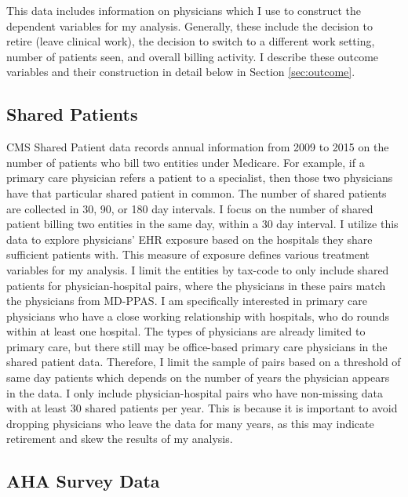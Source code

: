 \documentclass[11pt]{article}
\begin{document}
This data includes information on physicians which I use to construct the dependent variables for my analysis. Generally, these include the decision to retire (leave clinical work), the decision to switch to a different work setting, number of patients seen, and overall billing activity. I describe these outcome variables and their construction in detail below in Section \ref{sec:outcome}.


\subsection{Shared Patients}

CMS Shared Patient data records annual information from 2009 to 2015 on the number of patients who bill two entities under Medicare. For example, if a primary care physician refers a patient to a specialist, then those two physicians have that particular shared patient in common. The number of shared patients are collected in 30, 90, or 180 day intervals. I focus on the number of shared patient billing two entities in the same day, within a 30 day interval. I utilize this data to explore physicians' EHR exposure based on the hospitals they share sufficient patients with. This measure of exposure defines various treatment variables for my analysis. I limit the entities by tax-code to only include shared patients for physician-hospital pairs, where the physicians in these pairs match the physicians from MD-PPAS. I am specifically interested in primary care physicians who have a close working relationship with hospitals, who do rounds within at least one hospital. The types of physicians are already limited to primary care, but there still may be office-based primary care physicians in the shared patient data. Therefore, I limit the sample of pairs based on a threshold of same day patients which depends on the number of years the physician appears in the data. I only include physician-hospital pairs who have non-missing data with at least 30 shared patients per year. This is because it is important to avoid dropping physicians who leave the data for many years, as this may indicate retirement and skew the results of my analysis.

\subsection{AHA Survey Data}
\end{document}
